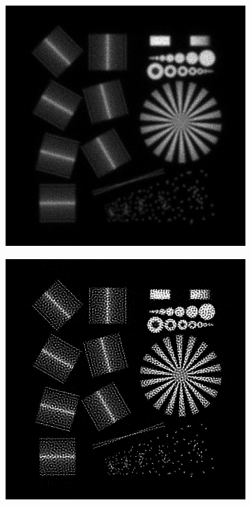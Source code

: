 \documentclass{juliacon}
\begin{document}
\begin{figure}[h]
\begin{subfigure}[b]{.16\textwidth}
                \includegraphics[width=.99\textwidth]{figures/resolution_test_chart_blurry.png}
                \caption{}
                \label{fig:fabioa}
            \end{subfigure}%
            \begin{subfigure}[b]{.16\textwidth}
                \centering
                \includegraphics[width=.99\textwidth]{figures/resolution_test_chart_no_reg_iter_50.png}

\end{subfigure}
\end{figure}
\end{document}
